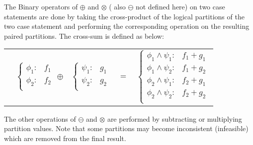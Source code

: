 \begin{itemize}
The Binary operators of $\oplus$ and $\otimes$ ( also $\ominus$ not defined here)  on two case statements are done by taking the cross-product of the logical partitions of the two case statement and performing the corresponding operation on the resulting paired partitions. The cross-sum is defined as below:
{\footnotesize 
\begin{center}
\begin{tabular}{r c c c l}
&
\hspace{-6mm} 
  $\begin{cases}
    \phi_1: & f_1 \\ 
    \phi_2: & f_2 \\ 
  \end{cases}$
$\oplus$
&
\hspace{-4mm}
  $\begin{cases}
    \psi_1: & g_1 \\ 
    \psi_2: & g_2 \\ 
  \end{cases}$
&
\hspace{-2mm} 
$ = $
&
\hspace{-2mm}
  $\begin{cases}
  \phi_1 \wedge \psi_1: & f_1 + g_1 \\ 
  \phi_1 \wedge \psi_2: & f_1 + g_2 \\ 
  \phi_2 \wedge \psi_1: & f_2 + g_1 \\ 
  \phi_2 \wedge \psi_2: & f_2 + g_2 \\ 
  \end{cases}$
\end{tabular}
\end{center}
}
\normalsize
The other operations of $\ominus$ and $\otimes$ are performed by subtracting or multiplying partition values.  Note that some partitions may become inconsistent (infeasible)  which are removed from the final result. 


\end{itemize}
